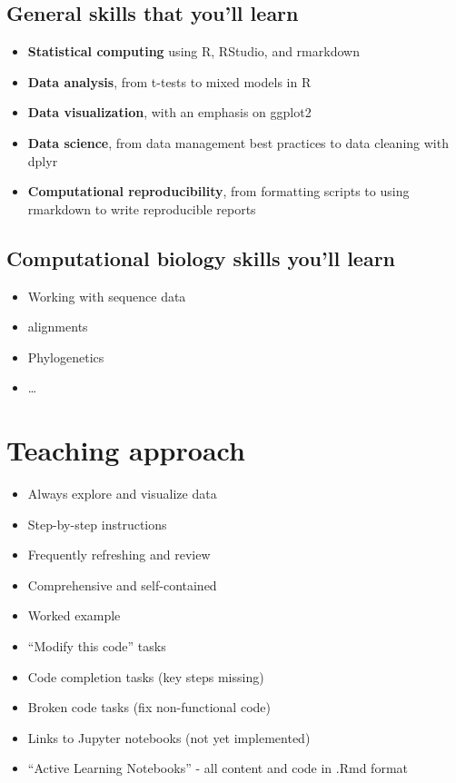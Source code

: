 \documentclass[
]{book}
\providecommand{\tightlist}{%
  \setlength{\itemsep}{0pt}\setlength{\parskip}{0pt}}
\begin{document}
\hypertarget{general-skills-that-youll-learn}{%
\subsection{General skills that you'll learn}\label{general-skills-that-youll-learn}}

\begin{itemize}
\tightlist
\item
  \textbf{Statistical computing} using R, RStudio, and rmarkdown
\item
  \textbf{Data analysis}, from t-tests to mixed models in R
\item
  \textbf{Data visualization}, with an emphasis on ggplot2
\item
  \textbf{Data science}, from data management best practices to data cleaning with dplyr
\item
  \textbf{Computational reproducibility}, from formatting scripts to using rmarkdown to write reproducible reports
\end{itemize}

\hypertarget{computational-biology-skills-youll-learn}{%
\subsection{Computational biology skills you'll learn}\label{computational-biology-skills-youll-learn}}

\begin{itemize}
\tightlist
\item
  Working with sequence data
\item
  alignments
\item
  Phylogenetics
\item
  \ldots{}
\end{itemize}

\hypertarget{teaching-approach}{%
\section{Teaching approach}\label{teaching-approach}}

\begin{itemize}
\tightlist
\item
  Always explore and visualize data
\item
  Step-by-step instructions
\item
  Frequently refreshing and review
\item
  Comprehensive and self-contained
\item
  Worked example
\item
  ``Modify this code'' tasks
\item
  Code completion tasks (key steps missing)
\item
  Broken code tasks (fix non-functional code)
\item
  Links to Jupyter notebooks (not yet implemented)
\item
  ``Active Learning Notebooks'' - all content and code in .Rmd format
\end{itemize}
\end{document}
